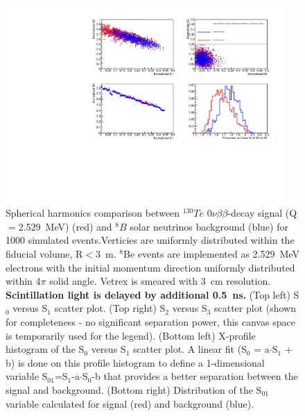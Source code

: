 \documentclass[12pt,twoside,letterpaper]{article}
\newcommand{\vbb}{0\nu\beta\beta}
\newcommand{\Te}{^{130}Te}
\newcommand{\B}{^{8}B}
\begin{document}
\begin{figure}[htb]
\centering
\includegraphics[angle=0,width=0.95\textwidth]{plots/hSLPlots_Te_allLight_VtxSmear3cm_VtxShiftX0cm_momDT1p0ns_sci0p5ns_rndVtx_3p0mSphere.pdf}
\caption{Spherical harmonics comparison between $\Te$ $\vbb$-decay signal (Q$=$2.529~MeV) (red) and $\B$ solar neutrinos background (blue) for 1000 simulated events.Verticies are uniformly distributed within the fiducial volume, R$<$3~m. $^8$Be events are implemented as 2.529~MeV electrons with the initial momentum direction uniformly distributed within 4$\pi$ solid angle. Vetrex is smeared with 3~cm resolution. {\bf Scintillation light is delayed by additional 0.5~ns.} (Top left) S$_0$ versus S$_1$ scatter plot. (Top right) S$_2$ versus S$_3$ scatter plot (shown for completeness - no significant separation power, this canvas space is temporarily used for the legend). (Bottom left) X-profile histogram of the S$_0$ versus S$_1$ scatter plot. A linear fit (S$_0$ = a$\cdot$S$_1$ + b) is done on this profile histogram to define a 1-dimensional variable S$_{01}$=S$_1$-a$\cdot$S$_0$-b that provides a better separation between the signal and background. (Bottom right) Distribution of the S$_{01}$ variable calculated for signal (red) and background (blue).}
\label{fig:SL_Te_momDT1ns_sci0p5ns_rndVtx_3p0m}
\end{figure}
\end{document}

